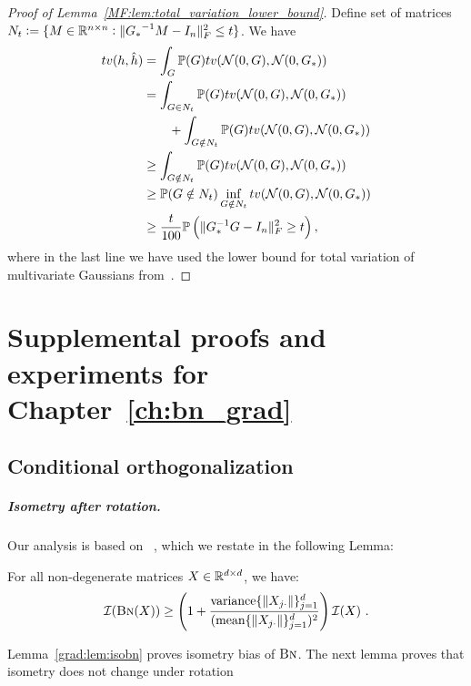 \begin{proof}[Proof of Lemma~\ref{MF:lem:total_variation_lower_bound}]
Define set of matrices $N_t:=\{M\in\mathbb{R}^{n\times n}: \lVert{G_*}^{-1}M- I_n\rVert_F^2\le t \}$. We have
\begin{align}
    {{tv}}(h,\hat h) &= \int_G \mathbb{P}(G){{tv}}(\mathcal{N}(0,G),\mathcal{N}(0,G_*)) \\
    & = \int_{G\in N_t} \mathbb{P}(G){{tv}}(\mathcal{N}(0,G),\mathcal{N}(0,G_*)) \\
    &\qquad + \int_{G\notin N_t} \mathbb{P}(G){{tv}}(\mathcal{N}(0,G),\mathcal{N}(0,G_*)) \\
    &\ge \int_{G\notin N_t} \mathbb{P}(G){{tv}}(\mathcal{N}(0,G),\mathcal{N}(0,G_*)) \\
    &\ge \mathbb{P}(G \notin N_t) \inf_{G\notin N_t}{{tv}}(\mathcal{N}(0,G),\mathcal{N}(0,G_*))\\
    &\ge \frac{t}{100} \mathbb{P}\left(\lVert G_*^{-1}G-I_n\rVert_F^2\ge t\right),
\end{align}
where in the last line we have used the lower bound for total variation of multivariate Gaussians from~\cite{devroye2018total}.
\end{proof}

\chapter{Supplemental proofs and experiments for Chapter~\ref{ch:bn_grad}}




\section{Conditional orthogonalization}
% 
\paragraph{Isometry after rotation.}
Our analysis is based on ~\citep[Corollary 3]{joudaki2023impact}, which we restate in the following Lemma:
\begin{lemma}
    \label{grad:lem:isobn}
    For all non-degenerate matrices $X \in \mathbb{R}^{d \times d}$, we have:
    \begin{align}
        \mathcal{I}(\text{\sc{Bn}}(X))\geq \left(1+ \frac{\text{variance}\{\|X_{j\cdot}\|\}_{j=1}^d}{(\text{mean} \{\|X_{j\cdot}\|\}_{j=1}^d)^2}\right) \mathcal{I}(X)~.
    \end{align}
\end{lemma}

Lemma~\ref{grad:lem:isobn} proves isometry bias of $\text{\sc{Bn}}$. The next lemma proves that isometry does not change under rotation  

